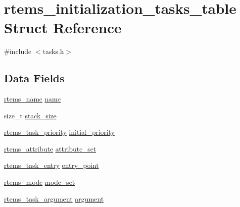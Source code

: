 \hypertarget{structrtems__initialization__tasks__table}{}\section{rtems\+\_\+initialization\+\_\+tasks\+\_\+table Struct Reference}
\label{structrtems__initialization__tasks__table}


{\ttfamily \#include $<$tasks.\+h$>$}

\subsection*{Data Fields}
\begin{DoxyCompactItemize}
\item 
\mbox{\hyperlink{group__ClassicTasks_ga55fb63c49f68c0cbd9bee004da15b1fd}{rtems\+\_\+name}} \mbox{\hyperlink{structrtems__initialization__tasks__table_a3500cd16dc2ae210a681a2bad986d630}{name}}
\item 
size\+\_\+t \mbox{\hyperlink{structrtems__initialization__tasks__table_ae2d552be04e90d74dc1d46105cc23b6d}{stack\+\_\+size}}
\item 
\mbox{\hyperlink{group__ClassicTasks_gaa80a0c0938307d1e99d0eb5fee765b47}{rtems\+\_\+task\+\_\+priority}} \mbox{\hyperlink{structrtems__initialization__tasks__table_a31446a9f0943284b127c2dd97d580bad}{initial\+\_\+priority}}
\item 
\mbox{\hyperlink{group__ClassicAttributes_gaea40313cf78ed843e09c4315d0a10f79}{rtems\+\_\+attribute}} \mbox{\hyperlink{structrtems__initialization__tasks__table_ad663000b02b4452f6c524151ae68228e}{attribute\+\_\+set}}
\item 
\mbox{\hyperlink{group__ClassicTasks_ga3232e2350ecd8d85855ab1f6ec186828}{rtems\+\_\+task\+\_\+entry}} \mbox{\hyperlink{structrtems__initialization__tasks__table_a0b2b15fa7235fc42ed7f4cf3a051d33b}{entry\+\_\+point}}
\item 
\mbox{\hyperlink{group__ClassicModes_ga8d46a41a837840dc97336fdcd20e4f68}{rtems\+\_\+mode}} \mbox{\hyperlink{structrtems__initialization__tasks__table_aabad7c00e2e614998b7f51b1b5e0f4be}{mode\+\_\+set}}
\item 
\mbox{\hyperlink{group__ClassicTasks_gaf202f985ef5a3156f29eae99a0536842}{rtems\+\_\+task\+\_\+argument}} \mbox{\hyperlink{structrtems__initialization__tasks__table_aef6f277b2c00ff8cf865ec6f5fbe46ec}{argument}}
\end{DoxyCompactItemize}


